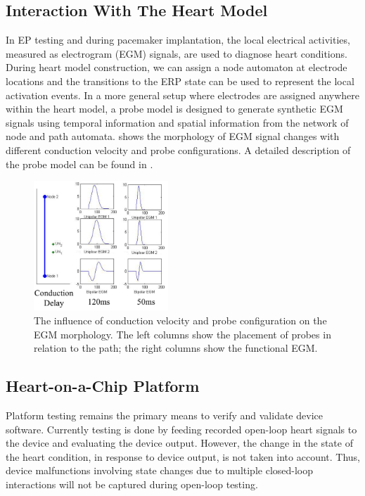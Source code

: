 \subsection{Interaction With The Heart Model}
In EP testing and during pacemaker implantation, the local electrical activities, measured as electrogram (EGM) signals, are used to diagnose heart conditions. During heart model construction, we can assign a node automaton at electrode locations and the transitions to the ERP state can be used to represent the local activation events. In a more general setup where electrodes are assigned anywhere within the heart model, a probe model is designed to generate synthetic EGM signals using temporal information and spatial information from the network of node and path automata.  shows the morphology of EGM signal changes with different conduction velocity and probe configurations. A detailed description of the probe model can be found in \cite{vhm_embc11}.

\begin{figure}[!t]
\center
		\includegraphics[width=0.45\textwidth]{figs/fig7.png}
\caption{The influence of conduction velocity and probe configuration on the EGM morphology. The left columns show the placement of probes in relation to the path; the right columns show the functional EGM.}
\label{fig:egm_s}
\end{figure}
\subsection{Heart-on-a-Chip Platform}
Platform testing remains the primary means to verify and validate device software. Currently testing is done by feeding recorded open-loop heart signals to the device and evaluating the device output. However, the change in the state of the heart condition, in response to device output, is not taken into account. Thus, device malfunctions involving state changes due to multiple closed-loop interactions will not be captured during open-loop testing. 

